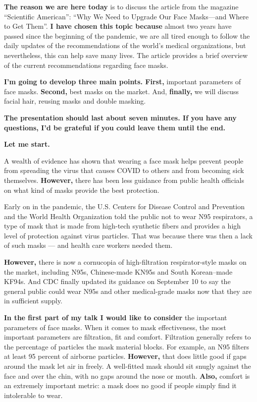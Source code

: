 \documentclass[a4paper, 14pt]{extarticle}
\renewcommand{\emph}{\textbf}
\begin{document}
\textbf{The reason we are here today} is to discuss the article from the magazine ``Scientific American'': ``Why We Need to Upgrade Our Face Masks—and Where to Get Them''.\textbf{ I have chosen this topic because}
almost two years have passed since the beginning of the pandemic, we are all tired enough to follow the daily updates of the recommendations of the world's medical organizations, but nevertheless, this can help save many lives. The article provides a brief overview of the current recommendations regarding face masks.

\emph{I'm going to develop three main points. First,}
important parameters of face masks. \emph{Second, } best masks on the market. And, \emph{finally,}  we will discuss facial hair, reusing masks and double masking.

\emph{The presentation should last about seven minutes. If you have any questions, I’d be grateful if you could leave them until the end.}

\emph{Let me start.}

A wealth of evidence has shown that wearing a face mask helps prevent people from spreading the virus that causes COVID to others and from becoming sick themselves. \emph{However,} there has been less guidance from public health officials on what kind of masks provide the best protection.

Early on in the pandemic, the U.S. Centers for Disease Control and Prevention and the World Health Organization told the public not to wear N95 respirators, a type of mask that is made from high-tech synthetic fibers and provides a high level of protection against virus particles. That was because there was then a lack of such masks --- and health care workers needed them.

\emph{However,} there is now a cornucopia of high-filtration respirator-style masks on the market, including N95s, Chinese-made KN95s and South Korean–made KF94s. And CDC finally updated its guidance on September 10 to say the general public could wear N95s and other medical-grade masks now that they are in sufficient supply.

\emph{In the first part of my talk I would like to consider} the important parameters of face masks.
When it comes to mask effectiveness, the most important parameters are filtration, fit and comfort. Filtration generally refers to the percentage of particles the mask material blocks. For example, an N95 filters at least 95 percent of airborne particles. \emph{However,} that does little good if gaps around the mask let air in freely. A well-fitted mask should sit snugly against the face and over the chin, with no gaps around the nose or mouth. \emph{Also,} comfort is an extremely important metric: a mask does no good if people simply find it intolerable to wear.
\end{document}
